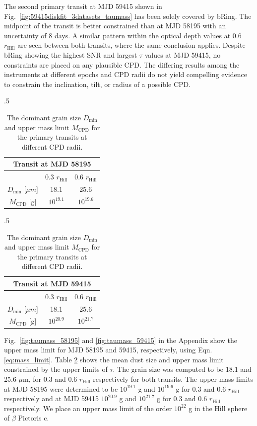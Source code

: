 \documentclass{aa}
\newcommand\picc{$\beta$ Pictoris c}
\begin{document}
%
The second primary transit at MJD 59415 shown in Fig.~\ref{fig:59415diskfit_3datasets_taumass} has been solely covered by bRing.
%
The midpoint of the transit is better constrained than at MJD 58195 with an uncertainty of 8 days.
% 
A similar pattern within the optical depth values at 0.6 $r_{\text{Hill}}$ are seen between both transits, where the same conclusion applies. 
%
Despite bRing showing the highest SNR and largest $\tau$ values at MJD 59415, no constraints are placed on any plausible CPD.
%
The differing results among the instruments at different epochs and CPD radii do not yield compelling evidence to constrain the inclination, tilt, or radius of a possible CPD.

\begin{table}[h!] 
    \caption{The dominant grain size $D_{\text{min}}$ and upper mass limit $M_{\text{CPD}}$ for the primary transits at different CPD radii.}
    \begin{subtable}{.5\linewidth}
      \centering
\begin{tabular}{ccc}
  \hline
  \multicolumn{3}{c}{Transit at MJD 58195 } \\
  \hline
  \hline
& 0.3 $r_{\text{Hill}}$ & 0.6 $r_{\text{Hill}}$\\
\hline
 \hline
$D_{\text{min}}$  [$\mu m$]  & 18.1    &25.6\\
$M_{\text{CPD}}$ [g]&   $10^{19.1}$  & $10^{19.6}$ \\
 \hline
\end{tabular}
    \end{subtable}%
    \begin{subtable}{.5\linewidth}
      \centering
      
        \begin{tabular}{ccc}
 \hline
 \multicolumn{3}{c}{Transit at MJD 59415} \\
 \hline
 \hline
& 0.3 $r_{\text{Hill}}$ & 0.6 $r_{\text{Hill}}$\\
 \hline
$D_{\text{min}}$ [$\mu m$]  & 18.1    & 25.6\\
$M_{\text{CPD}}$ [g]&   $10^{20.9}$  & $10^{21.7}$ \\
 \hline
\end{tabular}
    \end{subtable} 
    \label{tab:uppermass}
\end{table} 

%
Fig.~\ref{fig:taumass_58195} and \ref{fig:taumass_59415} in the Appendix show the upper mass limit for MJD 58195 and 59415, respectively, using Eqn. \ref{eq:mass_limit}.
%
Table \ref{tab:uppermass} shows the mean dust size and upper mass limit constrained by the upper limits of $\tau$.
%
The grain size was computed to be 18.1 and 25.6 $\mu$m, for 0.3 and 0.6 $r_{\text{Hill}}$ respectively for both transits. 
%
The upper mass limits at MJD 58195 were determined to be $10^{19.1} $ g and $10^{19.6}$ g for 0.3 and 0.6 
$r_{\text{Hill}}$ respectively and at MJD 59415 $10^{20.9}$ g and $10^{21.7}$ g for 0.3 and 0.6 $r_{\text{Hill}}$ respectively.
%
We place an upper mass limit of the order $10^{22}$ g in the Hill sphere of \picc{}.
\end{document}
